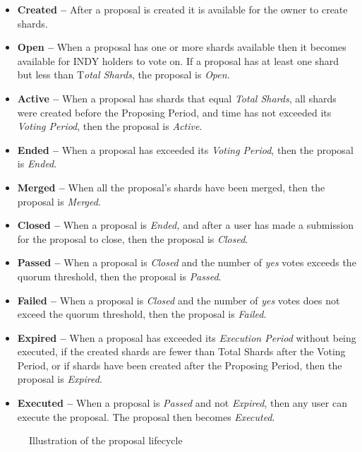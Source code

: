 \documentclass{article}
\begin{document}
\begin{sloppypar}
\begin{itemize}
\item
  \textbf{Created --} After a proposal is created it is available for
  the owner to create shards.
\item
  \textbf{Open --} When a proposal has one or more shards available then
  it becomes available for INDY holders to vote on. If a proposal has at
  least one shard but less than T\emph{otal Shards}, the proposal is
  \emph{Open}.
\item
  \textbf{Active --} When a proposal has shards that equal \emph{Total
  Shards}, all shards were created before the Proposing Period, and time
  has not exceeded its \emph{Voting Period}, then the proposal is
  \emph{Active}.
\item
  \textbf{Ended --} When a proposal has exceeded its \emph{Voting
  Period}, then the proposal is \emph{Ended}.
\item
  \textbf{Merged --} When all the proposal's shards have been merged,
  then the proposal is \emph{Merged}.
\item
  \textbf{Closed --} When a proposal is \emph{Ended,} and after a user
  has made a submission for the proposal to close, then the proposal is
  \emph{Closed}.
\item
  \textbf{Passed --} When a proposal is \emph{Closed} and the number of
  \emph{yes} votes exceeds the quorum threshold, then the proposal is
  \emph{Passed}.
\item
  \textbf{Failed --} When a proposal is \emph{Closed} and the number of
  \emph{yes} votes does not exceed the quorum threshold, then the
  proposal is \emph{Failed}.
\item
  \textbf{Expired --} When a proposal has exceeded its \emph{Execution
  Period} without being executed, if the created shards are fewer than
  Total Shards after the Voting Period, or if shards have been created
  after the Proposing Period, then the proposal is \emph{Expired}.
\item
  \textbf{Executed --} When a proposal is \emph{Passed} and not
  \emph{Expired}, then any user can execute the proposal. The proposal
  then becomes \emph{Executed}.
\end{itemize}

\hypertarget{governance-proposal-lifecycle}{%
\begin{figure}[htbp]
\centering

\caption{Illustration of the proposal lifecycle}
\end{figure}}


\end{sloppypar}
\end{document}
